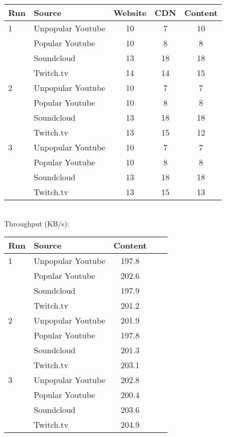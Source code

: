 \documentclass{sig-alternate-05-2015}
\begin{document}
\begin{tabular}{|l|l|c|c|c|} \hline
Run & Source & Website & CDN & Content \\ \hline
1 & Unpopular Youtube & 10 & 7  & 10 \\ \hline
  & Popular Youtube   & 10 & 8  & 8  \\ \hline
  & Soundcloud        & 13 & 18 & 18 \\ \hline
  & Twitch.tv         & 14 & 14 & 15 \\ \hline
2 & Unpopular Youtube & 10 & 7  & 7  \\ \hline
  & Popular Youtube   & 10 & 8  & 8  \\ \hline
  & Soundcloud        & 13 & 18 & 18 \\ \hline
  & Twitch.tv         & 13 & 15 & 12 \\ \hline
3 & Unpopular Youtube & 10 & 7  & 7  \\ \hline
  & Popular Youtube   & 10 & 8  & 8  \\ \hline
  & Soundcloud        & 13 & 18 & 18 \\ \hline
  & Twitch.tv         & 13 & 15 & 13 \\ \hline
\end{tabular}
\vspace{1em} \\
Throughput (KB/s): \\
\begin{tabular}{|l|l|c|c|c|} \hline
Run & Source & Content \\ \hline
1 & Unpopular Youtube & 197.8 \\ \hline
  & Popular Youtube   & 202.6 \\ \hline
  & Soundcloud        & 197.9 \\ \hline
  & Twitch.tv         & 201.2 \\ \hline
2 & Unpopular Youtube & 201.9 \\ \hline
  & Popular Youtube   & 197.8 \\ \hline
  & Soundcloud        & 201.3 \\ \hline
  & Twitch.tv         & 203.1 \\ \hline
3 & Unpopular Youtube & 202.8 \\ \hline
  & Popular Youtube   & 200.4 \\ \hline
  & Soundcloud        & 203.6 \\ \hline
  & Twitch.tv         & 204.9 \\ \hline
\end{tabular}
\end{document}

